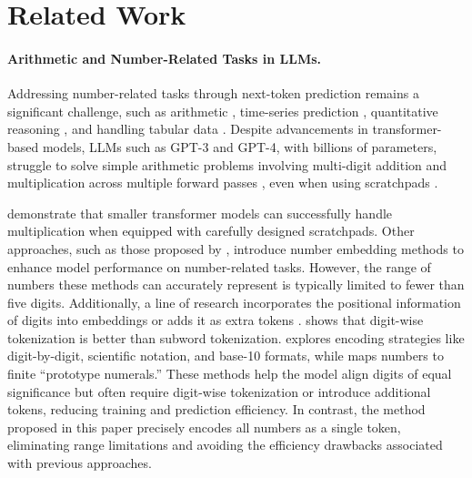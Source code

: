 \section{Related Work}
\paragraph{Arithmetic and Number-Related Tasks in LLMs.}
Addressing number-related tasks through next-token prediction remains a significant challenge, such as arithmetic \cite{saxton2019analysing, yu2023metamath, meidani2023snip},  time-series prediction \cite{tan2024language,merrill2024language,ma2024survey, zhou2023one,liu2024taming,jin2023time}, quantitative reasoning \cite{mcleish2024benchmarking,liu2024llms,chen2023theoremqa,jin2024cladder,cobbe2021training}, and handling tabular data \cite{gao2024raw,fang2024large,sahakyan2021explainable}.
Despite advancements in transformer-based models, LLMs such as GPT-3 and GPT-4, with billions of parameters, struggle to solve simple arithmetic problems involving multi-digit addition and multiplication across multiple forward passes \cite{dziri2024faith, feng2024numerical}, even when using scratchpads \cite{nye2021show}. 

\citet{lee2023teaching} demonstrate that smaller transformer models can successfully handle multiplication when equipped with carefully designed scratchpads.
Other approaches, such as those proposed by \citet{golkar2023xval, sundararaman2020methods, jiang2019learning,sivakumar2024leverage}, introduce number embedding methods to enhance model performance on number-related tasks. However, the range of numbers these methods can accurately represent is typically limited to fewer than five digits.
Additionally, a line of research \cite{mcleish2024transformers, shen2023positional} incorporates the positional information of digits into embeddings or adds it as extra tokens \cite{nogueira2021investigating}. \citet{zhou2024scaling} shows that digit-wise tokenization is better than subword tokenization. \citet{thawani2021representing} explores encoding strategies like digit-by-digit, scientific notation, and base-10 formats, while \citet{jiang2019learning} maps numbers to finite ``prototype numerals.'' These methods help the model align digits of equal significance but often require digit-wise tokenization or introduce additional tokens, reducing training and prediction efficiency.
In contrast, the method proposed in this paper precisely encodes all numbers as a single token, eliminating range limitations and avoiding the efficiency drawbacks associated with previous approaches.

